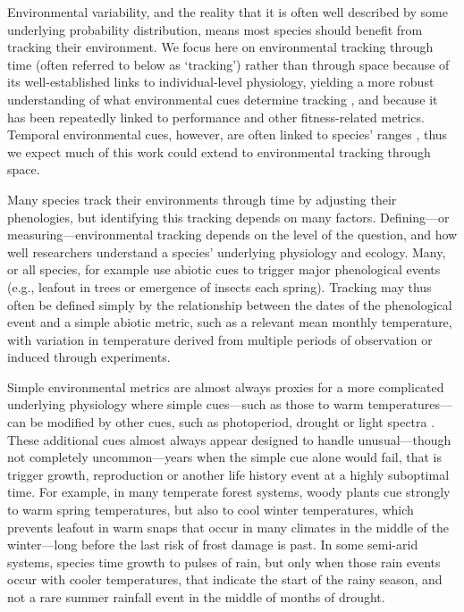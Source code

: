 \documentclass[11pt,letterpaper]{article}
\begin{document}
Environmental variability, and the reality that it is often well described by some underlying probability distribution, means most species should benefit from tracking their environment. We focus here on environmental tracking through time (often referred to below as `tracking') rather than through space because of its well-established links to individual-level physiology, yielding a more robust understanding of what environmental cues determine tracking \citep{chuineJTB,Chew:2012pd}, and because it has been repeatedly linked to performance and other fitness-related metrics. Temporal environmental cues, however, are often linked to species' ranges \citep{Morin:2008vp,arabid2011}, thus we expect much of this work could extend to environmental tracking through space.  %

Many species track their environments through time by adjusting their phenologies, but identifying this tracking depends on many factors. Defining---or measuring---environmental tracking depends on the level of the question, and how well researchers understand a species' underlying physiology and ecology. Many, or all species, for example use abiotic cues to trigger major phenological events (e.g., leafout in trees or emergence of insects each spring). Tracking may thus often be defined simply by the relationship between the dates of the phenological event and a simple abiotic metric, such as a relevant mean monthly temperature, with variation in temperature derived from multiple periods of observation or induced through experiments. 

Simple environmental metrics are almost always proxies for a more complicated underlying physiology where simple cues---such as those to warm temperatures---can be modified by other cues, such as photoperiod, drought or light spectra \citep{Bagnall1993,Stinchcombe:2004ec}. These additional cues almost always appear designed to handle unusual---though not completely uncommon---years when the simple cue alone would fail, that is trigger growth, reproduction or another life history event at a highly suboptimal time. For example, in many temperate forest systems, woody plants cue strongly to warm spring temperatures, but also to cool winter temperatures, which prevents leafout in warm snaps that occur in many climates in the middle of the winter---long before the last risk of frost damage is past. In some semi-arid systems, species time growth to pulses of rain, but only when those rain events occur with cooler temperatures, that indicate the start of the rainy season, and not a rare summer rainfall event in the middle of months of drought.  %
\end{document}
